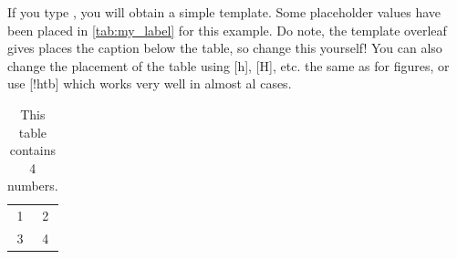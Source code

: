 If you type , you will obtain a simple template. Some placeholder values have been placed in \autoref{tab:my_label} for this example. Do note, the template overleaf gives places the caption below the table, so change this yourself! You can also change the placement of the table using [h], [H], etc. the same as for figures, or use [!htb] which works very well in almost al cases.

\begin{table}[!htb]
    \caption{This table contains 4 numbers.}
    \label{tab:my_label}
    \centering
    \begin{tabular}{c|c}
       1 & 2 \\
       3 & 4
    \end{tabular}
\end{table}